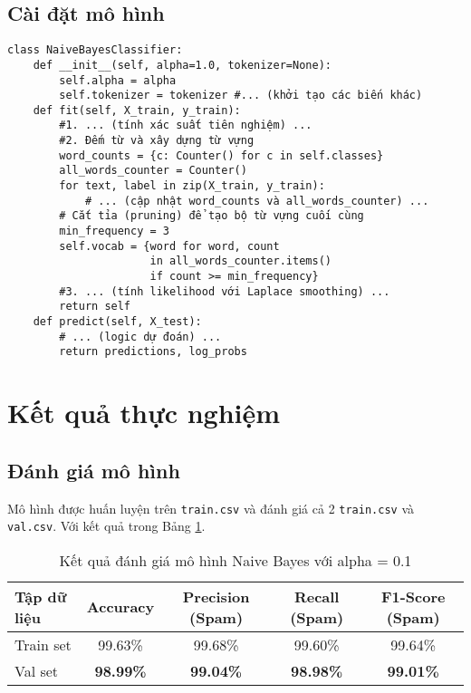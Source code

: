 \subsection{Cài đặt mô hình}
\begin{verbatim}
class NaiveBayesClassifier:
    def __init__(self, alpha=1.0, tokenizer=None):
        self.alpha = alpha
        self.tokenizer = tokenizer #... (khởi tạo các biến khác)
    def fit(self, X_train, y_train):
        #1. ... (tính xác suất tiên nghiệm) ...
        #2. Đếm từ và xây dựng từ vựng
        word_counts = {c: Counter() for c in self.classes}
        all_words_counter = Counter()
        for text, label in zip(X_train, y_train):
            # ... (cập nhật word_counts và all_words_counter) ...
        # Cắt tỉa (pruning) để tạo bộ từ vựng cuối cùng
        min_frequency = 3
        self.vocab = {word for word, count 
                      in all_words_counter.items() 
                      if count >= min_frequency}
        #3. ... (tính likelihood với Laplace smoothing) ...
        return self
    def predict(self, X_test):
        # ... (logic dự đoán) ...
        return predictions, log_probs
\end{verbatim}

\section{Kết quả thực nghiệm}

\subsection{Đánh giá mô hình}
Mô hình được huấn luyện trên \texttt{train.csv} và đánh giá cả 2 \texttt{train.csv} và \texttt{val.csv}. Với kết quả trong Bảng \ref{tab:results}.

\begin{table}[H]
\centering
\begin{tabular}{|l|c|c|c|c|}
\hline
\textbf{Tập dữ liệu} & \textbf{Accuracy} & \textbf{Precision (Spam)} & \textbf{Recall (Spam)} & \textbf{F1-Score (Spam)} \\
\hline
Train set & 99.63\% & 99.68\% & 99.60\% & 99.64\% \\
\hline
Val set & \textbf{98.99\%} & \textbf{99.04\%} & \textbf{98.98\%} & \textbf{99.01\%} \\
\hline
\end{tabular}
\caption{Kết quả đánh giá mô hình Naive Bayes với alpha = 0.1}
\label{tab:results}
\end{table}

